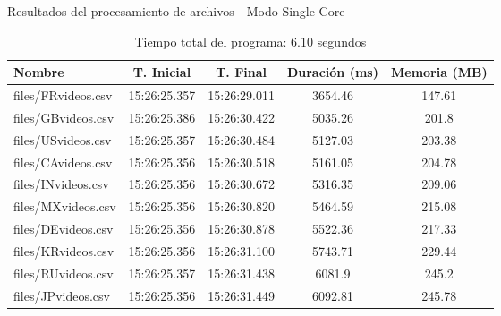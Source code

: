 \documentclass[a4paper,12pt]{report}
\begin{document}
\begin{table}[H]
\centering
\caption{Resultados del procesamiento de archivos - Modo Single Core}
\begin{tabular}{|l|c|c|c|c|}
\hline
\textbf{Nombre}       & \textbf{T. Inicial} & \textbf{T. Final} & \textbf{Duración (ms)} & \textbf{Memoria (MB)} \\ \hline
files/FRvideos.csv    & 15:26:25.357       & 15:26:29.011     & 3654.46                & 147.61                \\ \hline
files/GBvideos.csv    & 15:26:25.386       & 15:26:30.422     & 5035.26                & 201.8                 \\ \hline
files/USvideos.csv    & 15:26:25.357       & 15:26:30.484     & 5127.03                & 203.38                \\ \hline
files/CAvideos.csv    & 15:26:25.356       & 15:26:30.518     & 5161.05                & 204.78                \\ \hline
files/INvideos.csv    & 15:26:25.356       & 15:26:30.672     & 5316.35                & 209.06                \\ \hline
files/MXvideos.csv    & 15:26:25.356       & 15:26:30.820     & 5464.59                & 215.08                \\ \hline
files/DEvideos.csv    & 15:26:25.356       & 15:26:30.878     & 5522.36                & 217.33                \\ \hline
files/KRvideos.csv    & 15:26:25.356       & 15:26:31.100     & 5743.71                & 229.44                \\ \hline
files/RUvideos.csv    & 15:26:25.357       & 15:26:31.438     & 6081.9                 & 245.2                 \\ \hline
files/JPvideos.csv    & 15:26:25.356       & 15:26:31.449     & 6092.81                & 245.78                \\ \hline
\end{tabular}
\caption*{Tiempo total del programa: 6.10 segundos}
\end{table}
\end{document}
